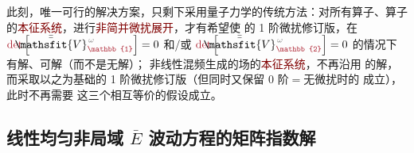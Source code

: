此刻，唯一可行的解决方案，只剩下采用量子力学的传统方法：对所有算子、算子的\textcolor{Maroon}{本征系统}，进行\textcolor{Maroon}{非简并微扰展开}，才有希望使 {\one}  的 1 阶微扰修订版，在 $\textcolor{Maroon}{\det} \left[ \Xint{\mathcolor{gray}{-}}{25}{\bar{\bar{\mathsfit{V}}}}^{\;\! \mathcolor{gray}{\omega}}_{\textcolor{Maroon}{\mathbb{1}}} \right] = 0$ 和/或 $\textcolor{Maroon}{\det} \left[ \Xint{\mathcolor{gray}{-}}{25}{\bar{\bar{\mathsfit{V}}}}^{\;\! \mathcolor{gray}{\omega}}_{\textcolor{Maroon}{\mathbb{2}}} \right] = 0$ 的情况下有解、可解（而不是无解）；{\two} 非线性混频生成的场的\textcolor{Maroon}{本征系统}，不再沿用  的解，而采取以之为基础的 1 阶微扰修订版（但同时又保留 0 阶$=$无微扰时的  成立），此时不再需要  这三个相互等价的假设成立。

\clearpage
\vspace*{-7.5em}


\subsection{线性均匀非局域 $\bar{E}$ 波动方程的矩阵指数解}\label{ssec:Exp-solution-linear}


